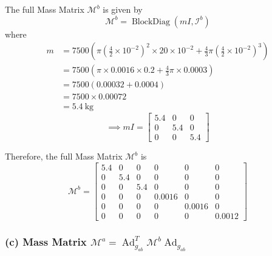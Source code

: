 The full Mass Matrix \( \mathcal{M}^{b} \) is given by
\begin{equation}
    \mathcal{M}^{b}=\operatorname{BlockDiag}\left(m I, \mathcal{I}^{b}\right)
\end{equation}
where
\begin{align*}
    m & =7500\left(\pi\left(\frac{4}{2} \times 10^{-2}\right)^{2} \times 20 \times 10^{-2}+\frac{4}{3} \pi\left(\frac{4}{2} \times 10^{-2}\right)^{3}\right) \\
      & =7500\left(\pi \times 0.0016 \times 0.2+\frac{4}{3} \pi \times 0.0003\right)                                                                         \\
      & =7500\left(0.00032+0.0004\right)                                                                                                                     \\
      & =7500 \times 0.00072                                                                                                                                 \\
      & =5.4 \mathrm{~kg}
\end{align*}
\begin{equation}
    \implies
    m I=\begin{bmatrix}
        5.4 & 0   & 0   \\
        0   & 5.4 & 0   \\
        0   & 0   & 5.4
    \end{bmatrix}
\end{equation}

Therefore, the full Mass Matrix \( \mathcal{M}^{b} \) is
\begin{equation}
    \mathcal{M}^{b}=\begin{bmatrix}
        5.4 & 0   & 0   & 0      & 0      & 0      \\
        0   & 5.4 & 0   & 0      & 0      & 0      \\
        0   & 0   & 5.4 & 0      & 0      & 0      \\
        0   & 0   & 0   & 0.0016 & 0      & 0      \\
        0   & 0   & 0   & 0      & 0.0016 & 0      \\
        0   & 0   & 0   & 0      & 0      & 0.0012
    \end{bmatrix}
\end{equation}

\subsubsection*{(c) Mass Matrix \( \mathcal{M}^{a}=\operatorname{Ad}_{g_{a b}}^{T} \mathcal{M}^{b} \operatorname{Ad}_{g_{a b}} \)}

